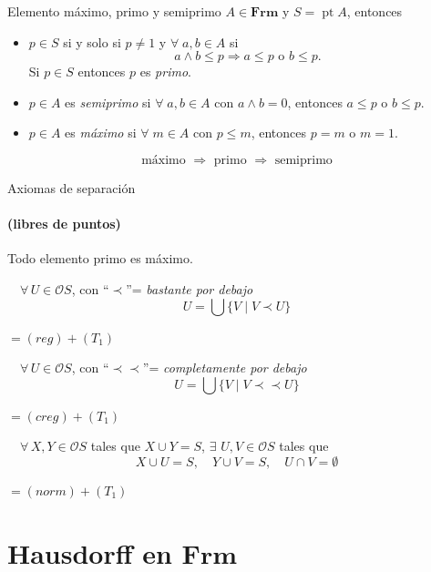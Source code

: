 \documentclass[compress,12pt]{beamer}
\DeclareMathOperator{\pt}{pt}
\begin{document}
\begin{frame}{Elemento máximo, primo y semiprimo}
    $A\in \mathbf{Frm}$ y $S=\pt A$, entonces 
    \begin{itemize}
        \item<2-> $p\in S$ si y solo si $p\neq 1$ y $\forall\; a, b\in A$ si 
        \[
        a\wedge b\leq p\Rightarrow a\leq p\mbox{ o } b\leq p.
        \]
        Si $p\in S$ entonces $p$ es \emph{primo}.
        \item<3-> $p\in A$ es \emph{semiprimo} si $\forall\; a, b\in A$ con $a\wedge b=0$, entonces $a\leq p$ o $b\leq p$.
        \item<4-> $p\in A$ es \emph{máximo} si $\forall\; m\in A$ con $p\leq m$, entonces $p=m$ o $m=1$.
    \end{itemize}

\[
    \mbox{máximo }\Rightarrow \mbox{ primo }\Rightarrow \mbox{ semiprimo}
    \]
\end{frame}

\begin{frame}{Axiomas de separación}
\framesubtitle{(libres de puntos)}
    \begin{description}
    \item[$(T_1)$] Todo elemento primo es máximo.
    \item<2->[$(reg)$] $\quad\forall\, U\in \mathcal{O}S$, con ``$\prec$''= \emph{bastante por debajo}
    \[
    U=\bigcup\{V\mid V\prec U\}
    \]
    \item<3->[$(T_3)$] $=(reg)+(T_{1})$ 
    \item<4->[$(creg)$] $\quad\forall\, U\in \mathcal{O}S$, con ``$\prec\prec$''= \emph{completamente por debajo}
    \[
    U=\bigcup\{V\mid V\prec\prec U\}
    \]
    \item<5->[$(T_{3\frac{1}{2}})$] $=(creg)+(T_{1})$ 
    \item<6->[$(norm)$] $\quad\forall\, X, Y \in \mathcal{O}S$ tales que $X\cup Y=S$, $\exists$ $U, V \in \mathcal{O}S$ tales que
    \[
    X\cup U=S, \quad Y\cup V=S, \quad U\cap V=\emptyset
    \]
    \item<7->[$(T_{4})$] $=(norm)+(T_{1})$ 
\end{description}
\end{frame}

\section{Hausdorff en $\mathbf{Frm}$}
\end{document}
